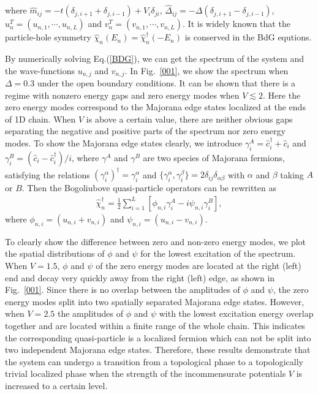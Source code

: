 \documentclass[prb,showpacs,twocolumn,aps,superscriptaddress,a4paper]{revtex4-1}
\begin{document}
where $ \hat{m}_{ij} = -t (\delta_{j,i+1} + \delta_{j,i-1}) +
V_{i}  \delta_{ji}$, $\hat{\Delta}_{ij} = - \Delta
(\delta_{j,i+1}-\delta_{j,i-1})$,
$u_n^T=(u_{n,1},\cdots,u_{n,L})$ and
$v_n^T=(v_{n,1},\cdots,v_{n,L})$.
It is widely known that the particle-hole symmetry $ \hat{\chi}_n (E _{n})=
\hat{\chi}_n^{\dagger} (-E _{n})$ is conserved in the BdG equtions.

By numerically solving Eq.(\ref{BDG}), we can get the spectrum of the system and the wave-functions $u_{n,j}$ and $v_{n,j}$.
In Fig.~\ref{001}, we show the spectrum when $\Delta=0.3$ under the open boundary conditions. It can be shown that there is a regime
with nonzero energy gaps and zero energy modes when $V\lesssim2$. Here the zero energy modes correspond to the Majorana edge states localized at the ends of 1D chain. When $V$ is above a certain value, there are neither obvious gaps separating the negative and positive parts of the spectrum nor zero energy modes. To show the Majorana edge states clearly,
we introduce $\gamma_i^A =
\hat{c}_{i}^{\dag }+ \hat{c}_{i}$ and $\gamma_i^B = (\hat{c}_{i}-
\hat{c}_{i}^{\dag })/i$,  where $\gamma^A$ and $\gamma^B$ are
two species of Majorana fermions, satisfying the relations
$(\gamma_i^\alpha)^{\dagger} = \gamma_i^\alpha$ and
$\{\gamma_i^\alpha, \gamma_i^\beta\} = 2
\delta_{ij} \delta_{\alpha \beta}$ with $\alpha$ and $\beta$
taking $A$ or $B$. Then the Bogoliubove quasi-particle operators can be rewritten as
\begin{eqnarray}
\hat{\chi} _{n}^{\dag } = \frac{1}{2}\sum_{i=1}^{L}[ \phi _{n, i}
\gamma_i^A  - i \psi _{n,i} \gamma_i^B ],
\end{eqnarray}
where $\phi _{n, i}=(u_{n, i}+ v_{n, i})$ and $ \psi _{n, i}=(u_{n, i} - v_{n, i})$.

To clearly show the difference between zero and non-zero energy modes, we plot the spatial distributions of $\phi$ and $\psi$ for the lowest excitation of the spectrum. When $V=1.5$, $\phi$ and $\psi$ of the zero energy modes are located at the right (left) end and decay very quickly away from the right (left) edge, as shown in Fig.~\ref{001}. Since there is no overlap between the amplitudes of $\phi$ and $\psi$, the zero energy modes split into two spatially separated Majorana edge states. However, when $V=2.5$ the amplitudes of $\phi$ and $\psi$ with the lowest excitation energy overlap together and are located within a finite range of the whole chain. This indicates the corresponding quasi-particle is a localized fermion which can not be split into two independent Majorana edge states. Therefore, these results demonstrate that the system can undergo a transition from a topological phase to a topologically trivial localized phase when the strength of the incommensurate potentials $V$ is increased to a certain level.
\end{document}

